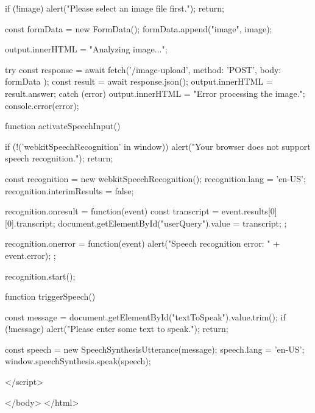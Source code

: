 \documentclass{josis}
\begin{document}
\begin{python}
{    if (!image) {
      alert("Please select an image file first.");
      return;
    }

    const formData = new FormData();
    formData.append("image", image);

    output.innerHTML = "Analyzing image...";

    try {
      const response = await fetch('/image-upload', {
        method: 'POST',
        body: formData
      });
      const result = await response.json();
      output.innerHTML = result.answer;
    } catch (error) {
      output.innerHTML = "Error processing the image.";
      console.error(error);
    }
  }

  function activateSpeechInput() {
    if (!('webkitSpeechRecognition' in window)) {
      alert("Your browser does not support speech recognition.");
      return;
    }

    const recognition = new webkitSpeechRecognition();
    recognition.lang = 'en-US';
    recognition.interimResults = false;

    recognition.onresult = function(event) {
      const transcript = event.results[0][0].transcript;
      document.getElementById("userQuery").value = transcript;
    };

    recognition.onerror = function(event) {
      alert("Speech recognition error: " + event.error);
    };

    recognition.start();
  }

  function triggerSpeech() {
    const message = document.getElementById("textToSpeak").value.trim();
    if (!message) {
      alert("Please enter some text to speak.");
      return;
    }

    const speech = new SpeechSynthesisUtterance(message);
    speech.lang = 'en-US';
    window.speechSynthesis.speak(speech);
  }
</script>

</body>
</html>
\end{python}
\end{document}
